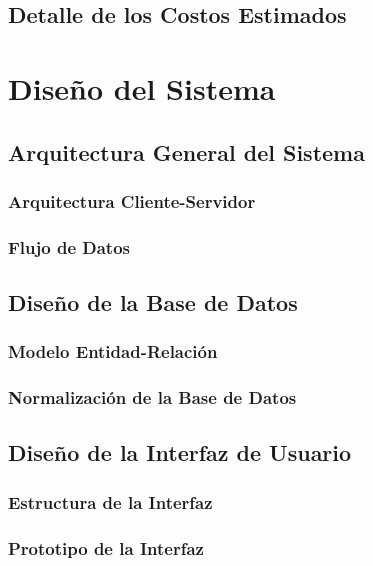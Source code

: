 \subsection{Detalle de los Costos Estimados}

\section{Diseño del Sistema}
\subsection{Arquitectura General del Sistema}
\subsubsection{Arquitectura Cliente-Servidor}
\subsubsection{Flujo de Datos}

\subsection{Diseño de la Base de Datos}
\subsubsection{Modelo Entidad-Relación}
\subsubsection{Normalización de la Base de Datos}

\subsection{Diseño de la Interfaz de Usuario}
\subsubsection{Estructura de la Interfaz}
\subsubsection{Prototipo de la Interfaz}
